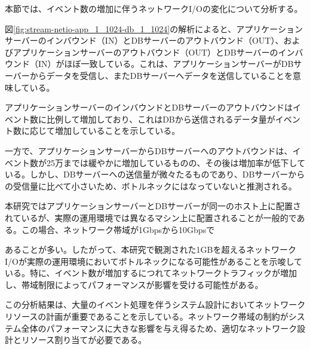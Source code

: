 \documentclass[../../../../../main]{subfiles}
\begin{document}
    \label{subsubsec:result-streaming-only-limit-diskio}

    本節では、イベント数の増加に伴うネットワークI/Oの変化について分析する。

    

    図\ref{fig:stream-netio-app_1_1024-db_1_1024}の解析によると、アプリケーションサーバーのインバウンド（IN）とDBサーバーのアウトバウンド（OUT）、およびアプリケーションサーバーのアウトバウンド（OUT）とDBサーバーのインバウンド（IN）がほぼ一致している。これは、アプリケーションサーバーがDBサーバーからデータを受信し、またDBサーバーへデータを送信していることを意味している。

    アプリケーションサーバーのインバウンドとDBサーバーのアウトバウンドはイベント数に比例して増加しており、これはDBから送信されるデータ量がイベント数に応じて増加していることを示している。

    一方で、アプリケーションサーバーからDBサーバーへのアウトバウンドは、イベント数が25万までは緩やかに増加しているものの、その後は増加率が低下している。しかし、DBサーバーへの送信量が微々たるものであり、DBサーバーからの受信量に比べて小さいため、ボトルネックにはなっていないと推測される。

    本研究ではアプリケーションサーバーとDBサーバーが同一のホスト上に配置されているが、実際の運用環境では異なるマシン上に配置されることが一般的である。この場合、ネットワーク帯域が1Gbpsから10Gbpsで

    あることが多い。したがって、本研究で観測された1GBを超えるネットワークI/Oが実際の運用環境においてボトルネックになる可能性があることを示唆している。特に、イベント数が増加するにつれてネットワークトラフィックが増加し、帯域制限によってパフォーマンスが影響を受ける可能性がある。

    この分析結果は、大量のイベント処理を伴うシステム設計においてネットワークリソースの計画が重要であることを示している。ネットワーク帯域の制約がシステム全体のパフォーマンスに大きな影響を与え得るため、適切なネットワーク設計とリソース割り当てが必要である。
\end{document}
